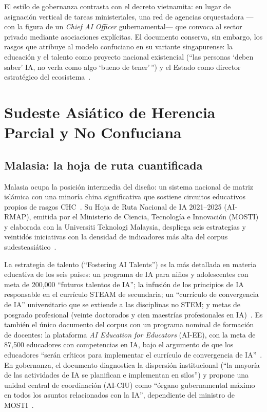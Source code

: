 El estilo de gobernanza contrasta con el decreto vietnamita: en lugar de asignación vertical de tareas ministeriales, una red de agencias orquestadora —con la figura de un \textit{Chief AI Officer} gubernamental— que convoca al sector privado mediante asociaciones explícitas. El documento conserva, sin embargo, los rasgos que \citet{marginson2011higher} atribuye al modelo confuciano en su variante singapurense: la educación y el talento como proyecto nacional existencial (``las personas `deben saber' IA, no verla como algo `bueno de tener'\,'') y el Estado como director estratégico del ecosistema~\citep{singapore2023nais2}.


\section{Sudeste Asiático de Herencia Parcial y No Confuciana}
\label{sec:sea-no-chc}

\subsection{Malasia: la hoja de ruta cuantificada}
\label{subsec:malasia}

Malasia ocupa la posición intermedia del diseño: un sistema nacional de matriz islámica con una minoría china significativa que sostiene circuitos educativos propios de rasgos CHC~\citep{welch2011higher}. Su Hoja de Ruta Nacional de IA 2021--2025 (AI-RMAP), emitida por el Ministerio de Ciencia, Tecnología e Innovación (MOSTI) y elaborada con la Universiti Teknologi Malaysia, despliega seis estrategias y veintidós iniciativas con la densidad de indicadores más alta del corpus sudesteasiático~\citep{malaysia2021airmap}.

La estrategia de talento (``Fostering AI Talents'') es la más detallada en materia educativa de los seis países: un programa de IA para niños y adolescentes con meta de 200,000 ``futuros talentos de IA''; la infusión de los principios de IA responsable en el currículo STEAM de secundaria; un ``currículo de convergencia de IA'' universitario que se extiende a las disciplinas no STEM; y metas de posgrado profesional (veinte doctorados y cien maestrías profesionales en IA)~\citep{malaysia2021airmap}. Es también el único documento del corpus con un programa nominal de formación de docentes: la plataforma \textit{AI Education for Educators} (AI-EE), con la meta de 87,500 educadores con competencias en IA, bajo el argumento de que los educadores ``serán críticos para implementar el currículo de convergencia de IA''~\citep{malaysia2021airmap}. En gobernanza, el documento diagnostica la dispersión institucional (``la mayoría de las actividades de IA se planifican e implementan en silos'') y propone una unidad central de coordinación (AI-CIU) como ``órgano gubernamental máximo en todos los asuntos relacionados con la IA'', dependiente del ministro de MOSTI~\citep{malaysia2021airmap}.

